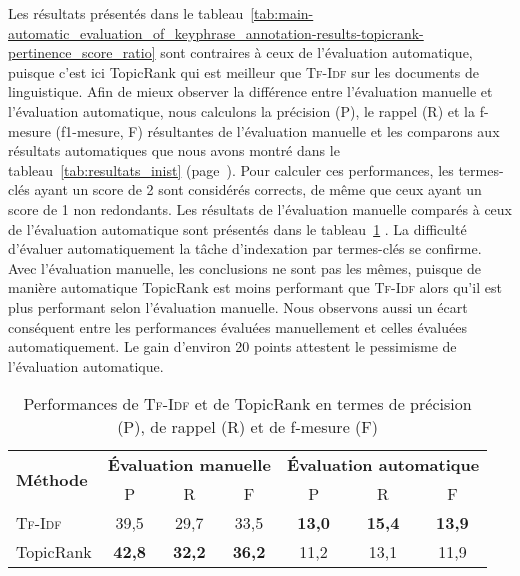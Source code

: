         Les résultats présentés dans le
        tableau~\ref{tab:main-automatic_evaluation_of_keyphrase_annotation-results-topicrank-pertinence_score_ratio}
        sont contraires à ceux de l'évaluation automatique, puisque c'est ici
        TopicRank qui est meilleur que \textsc{Tf-Idf} sur les documents de
        linguistique. Afin de mieux observer la différence entre l'évaluation
        manuelle et l'évaluation automatique, nous calculons la précision (P),
        le rappel (R) et la f-mesure (f1-mesure, F) résultantes de l'évaluation
        manuelle et les comparons aux résultats automatiques que nous avons
        montré dans le tableau~\ref{tab:resultats_inist}
        (page~\pageref{tab:resultats_inist}). Pour calculer ces performances,
        les termes-clés ayant un score de 2 sont considérés corrects, de même
        que ceux ayant un score de 1 non redondants. Les résultats de
        l'évaluation manuelle comparés à ceux de l'évaluation automatique sont
        présentés dans le
        tableau~\ref{tab:main-automatic_evaluation_of_keyphrase_annotation-results-topicrank-prf}
        . La difficulté d'évaluer automatiquement la tâche d'indexation par
        termes-clés se confirme. Avec l'évaluation manuelle, les conclusions ne
        sont pas les mêmes, puisque de manière automatique TopicRank est moins
        performant que \textsc{Tf-Idf} alors qu'il est plus performant selon
        l'évaluation manuelle. Nous observons aussi un écart conséquent entre
        les performances évaluées manuellement et celles évaluées
        automatiquement. Le gain d'environ 20 points attestent le pessimisme de
        l'évaluation automatique.
        \begin{table}[h!]
          \centering
          \begin{tabular}{l|ccc|ccc}
            \toprule
            \multirow{2}{*}{\textbf{Méthode}} & \multicolumn{3}{c|}{\textbf{Évaluation manuelle}} & \multicolumn{3}{c}{\textbf{Évaluation automatique}}\\
            \cline{2-7}
            & P & R & F & P & R & F\\
            \hline
            \textsc{Tf-Idf} & 39,5 & 29,7 & 33,5 & \textbf{13,0} & \textbf{15,4} & \textbf{13,9}\\
            TopicRank & \textbf{42,8} & \textbf{32,2} & \textbf{36,2} & 11,2 & 13,1 & 11,9\\
            \bottomrule
          \end{tabular}
          \caption[
            Performances de \textsc{Tf-Idf} et de TopicRank en termes de
            précision, de rappel et de f-mesure
          ]{
            Performances de \textsc{Tf-Idf} et de TopicRank en termes de
            précision (P), de rappel (R) et de f-mesure (F)
            \label{tab:main-automatic_evaluation_of_keyphrase_annotation-results-topicrank-prf}}
        \end{table}
      
